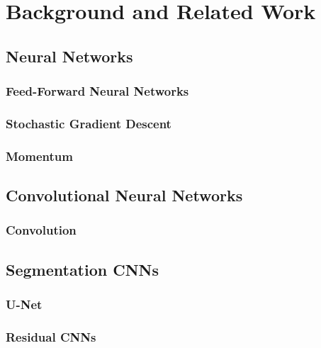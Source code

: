 
\section{Background and Related Work}


\subsection{Neural Networks}

\subsubsection{Feed-Forward Neural Networks}
 

\subsubsection{Stochastic Gradient Descent}
 

\subsubsection{Momentum}
 

% 



\subsection{Convolutional Neural Networks}

\subsubsection{Convolution}
 

\subsection{Segmentation CNNs}


\subsubsection{U-Net} \label{sec:uNet}


\subsubsection{Residual CNNs}





